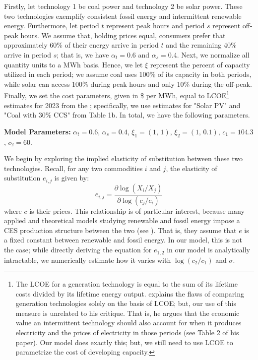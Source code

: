 \documentclass[11pt,a4paper,leqno]{extarticle}
\begin{document}
	Firstly, let technology 1 be coal power and technology 2 be solar power. These two technologies exemplify consistent fossil energy and intermittent renewable energy. Furthermore,  let period $t$ represent peak hours and period $s$ represent off-peak hours. We assume that, holding prices equal, consumers prefer that approximately 60\% of their energy arrive in period $t$ and the remaining 40\% arrive in period $s$; that is, we have $\alpha_t = 0.6$ and $\alpha_s = 0.4$. Next, we normalize all quantity units to a MWh basis. Hence, we let $\xi$ represent the percent of capacity utilized in each period; we assume coal uses 100\% of its capacity in both periods, while solar can access 100\% during peak hours and only 10\% during the off-peak. Finally, we set the cost parameters, given in  \$ per MWh, equal to LCOE\footnote{ The LCOE for a generation technology is equal to the sum of its lifetime costs divided by its lifetime energy output. \citet{Joskow2011} explains the flaws of comparing generation technologies solely on the basis of LCOE; but,  our use of this measure is unrelated to his critique. That is, he argues that the economic value an intermittent technology should also account for when it produces electricity and the prices of electricity in those periods (see Table 2 of his paper). Our model does exactly this; but, we still need to  use LCOE to parametrize the cost of developing capacity. } estimates for 2023 from the \citet{EIALCOE}; specifically, we use estimates for "Solar PV" and "Coal with 30\% CCS" from Table 1b.  In total, we have the following parameters. 
	
	\begin{center}
		\noindent \textbf{Model Parameters:} $\alpha_t = 0.6$, $\alpha_s = 0.4$, $\xi_1 = (1, \, 1)$, $\xi_2 = (1, \, 0.1)$, $c_1 = 104.3$, $c_2 = 60$. 
		\label{Params: Example A}
	\end{center}
	
	
	
	We begin by exploring the implied elasticity of substitution between these two technologies. Recall, for any two commodities $i$ and $j$,  the elasticity of substitution $e_{i,j}$ is given by:
	$$e_{i,j} = \frac{\partial \log (X_i/ X_j)}{\partial \log (c_j/c_i)}$$
	where $c$ is their prices. This relationship is of particular interest, because many applied and theoretical models studying renewable and fossil energy impose a CES production structure between the two (see \citet{Pap}). That is, they assume that $e$ is a fixed constant between renewable and fossil energy. In our model, this is not the case; while directly deriving the equation for $e_{1,2}$ in our model is analytically intractable, we numerically estimate how it varies with $\log (c_2/c_1)$ and $\sigma$.
	
\end{document}
